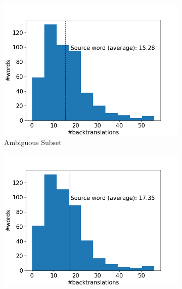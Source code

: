 \begin{figure}[!htb]
     \centering
     
     \begin{subfigure}{0.49\textwidth}
         \centering
         \includegraphics[width=\textwidth]{figures/alignment/align_sampling/word_backtranslations_original.png}
         \caption{Ambiguous Subset}
     \end{subfigure}
     \hfill
     \begin{subfigure}{0.49\textwidth}
         \centering
         \includegraphics[width=\textwidth]{figures/alignment/align_sampling/word_backtranslations_male.png}

\end{subfigure}
\end{figure}
